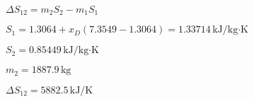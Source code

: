 \( \Delta S_{12} = m_2 S_2 - m_1 S_1 \)  

\( S_1 = 1.3064 + x_D (7.3549 - 1.3064) = 1.33714 \, \text{kJ/kg·K} \)  

\( S_2 = 0.85449 \, \text{kJ/kg·K} \)  

\( m_2 = 1887.9 \, \text{kg} \)  

\( \Delta S_{12} = 5882.5 \, \text{kJ/K} \)